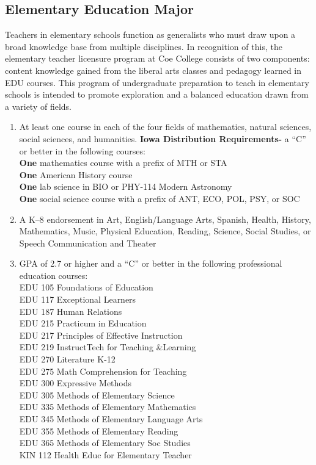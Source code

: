 \documentclass[
  letterpaper,
]{scrbook}
\providecommand{\tightlist}{%
  \setlength{\itemsep}{0pt}\setlength{\parskip}{0pt}}
\begin{document}
\subsection{Elementary Education
Major}\label{elementary-education-major}

Teachers in elementary schools function as generalists who must draw
upon a broad knowledge base from multiple disciplines. In recognition of
this, the elementary teacher licensure program at Coe College consists
of two components: content knowledge gained from the liberal arts
classes and pedagogy learned in EDU courses. This program of
undergraduate preparation to teach in elementary schools is intended to
promote exploration and a balanced education drawn from a variety of
fields.

\begin{enumerate}
\def\labelenumi{\arabic{enumi}.}
\tightlist
\item
  At least one course in each of the four fields of mathematics, natural
  sciences, social sciences, and humanities. \textbf{Iowa Distribution
  Requirements-} a ``C'' or better in the following courses:\\
  \textbf{One} mathematics course with a prefix of MTH or STA\\
  \textbf{One} American History course\\
  \textbf{One} lab science in BIO or PHY-114 Modern Astronomy\\
  \textbf{One} social science course with a prefix of ANT, ECO, POL,
  PSY, or SOC\\
\item
  A K--8 endorsement in Art, English/Language Arts, Spanish, Health,
  History, Mathematics, Music, Physical Education, Reading, Science,
  Social Studies, or Speech Communication and Theater\\
\item
  GPA of 2.7 or higher and a ``C'' or better in the following
  professional education courses:\\
  EDU 105 Foundations of Education\\
  EDU 117 Exceptional Learners\\
  EDU 187 Human Relations\\
  EDU 215 Practicum in Education\\
  EDU 217 Principles of Effective Instruction\\
  EDU 219 InstructTech for Teaching \&Learning\\
  EDU 270 Literature K-12\\
  EDU 275 Math Comprehension for Teaching\\
  EDU 300 Expressive Methods\\
  EDU 305 Methods of Elementary Science\\
  EDU 335 Methods of Elementary Mathematics\\
  EDU 345 Methods of Elementary Language Arts\\
  EDU 355 Methods of Elementary Reading\\
  EDU 365 Methods of Elementary Soc Studies\\
  KIN 112 Health Educ for Elementary Teacher
\end{enumerate}
\end{document}
